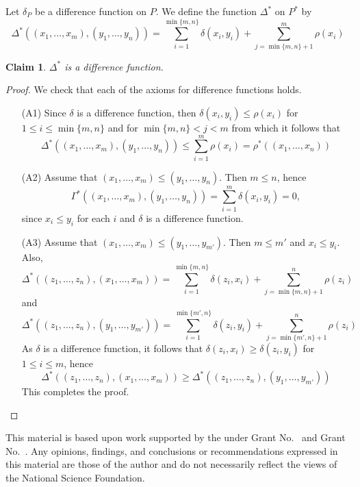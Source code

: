 \documentclass[acmsmall,review,anonymous]{acmart}\settopmatter{printfolios=true,printccs=false,printacmref=false}
\newtheorem{claim}{Claim}
\begin{document}
Let $\delta_P$ be a difference function on $P$. We define the function
$\Delta^*$ on $P^*$ by
$$\Delta^*((x_1, \ldots, x_m), (y_1, \ldots, y_n)) = \sum_{i=1}^{\min\{m,
n\}}\delta(x_i, y_i) + \sum_{j = \min\{m, n\} + 1}^{m}\rho(x_i)$$
\begin{claim}
$\Delta^*$ is a difference function.
\end{claim}
\begin{proof}
We check that each of the axioms for difference functions holds.
\begin{enumerate}
  \item[(A1)]
  Since $\delta$ is a difference function, then $\delta(x_i, y_i)
  \leq \rho(x_i)$ for $1 \leq i \leq \min\{m, n\}$ and for $\min\{m, n\} < j <
  m$ from which it follows that
  $$\Delta^*((x_1, \ldots, x_m), (y_1,
  \ldots, y_n)) \leq \sum_{i=1}^m\rho(x_i) = \rho^*((x_1, \ldots, x_n))$$
  \item[(A2)]
  Assume that $(x_1, \ldots, x_m) \leq (y_1, \ldots, y_n)$. Then $m \leq n$,
  hence
  $$\Gamma^*((x_1, \ldots, x_m), (y_1, \ldots, y_n)) =
  \sum_{i=1}^{m}\delta(x_i, y_i) = 0,$$
  since $x_i \leq y_i$ for each $i$ and $\delta$ is a difference function.
  \item[(A3)]
  Assume that $(x_1, \ldots, x_m) \leq (y_1, \ldots, y_{m'})$. Then $m \leq
  m'$ and $x_i \leq y_i$. Also, $$\Delta^*((z_1, \ldots, z_n), (x_1,
  \ldots, x_m)) = \sum_{i=1}^{\min\{m, n\}}\delta(z_i, x_i) + \sum_{j =
  \min\{m, n\} + 1}^{n}\rho(z_i)$$ and
  $$\Delta^*((z_1, \ldots, z_n), (y_1, \ldots, y_{m'})) =
  \sum_{i=1}^{\min\{m', n\}}\delta(z_i, y_i) + \sum_{j = \min\{m', n\} +
  1}^{n}\rho(z_i)$$
  As $\delta$ is a difference function, it follows that $\delta(z_i, x_i) \geq
  \delta(z_i, y_i)$ for $1 \leq i \leq m$, hence
  $$\Delta^*((z_1, \ldots, z_n), (x_1, \ldots, x_m)) \geq \Delta^*((z_1,
  \ldots, z_n), (y_1, \ldots, y_{m'}))$$ This completes the proof.
\end{enumerate}
\end{proof}
\fi
\begin{acks}                            %
This material is based upon work supported by the
 under Grant
No.~ and Grant
No.~.  Any opinions, findings, and
conclusions or recommendations expressed in this material are those
of the author and do not necessarily reflect the views of the
National Science Foundation.
\end{acks}





\end{document}
